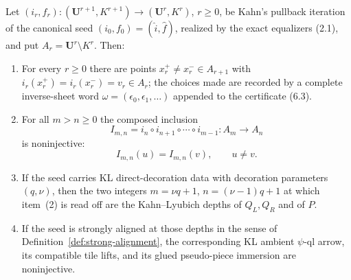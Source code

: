 \begin{theorem}\label{thm:propagation}
Let \((i_r,f_r)\colon(\mathbf U^{r+1},K^{r+1})\to(\mathbf U^r,K^r)\), \(r\ge0\), be Kahn's pullback iteration of the canonical seed \((i_0,f_0)=(\widehat i,\widehat f)\), realized by the exact equalizers (2.1), and put \(A_r=\mathbf U^r\setminus K^r\).  Then:
\begin{enumerate}
\item For every \(r\ge0\) there are points \(x_r^+\ne x_r^-\in A_{r+1}\) with \(i_r(x_r^+)=i_r(x_r^-)=v_r\in A_r\); the choices made are recorded by a complete inverse-sheet word \(\omega=(\epsilon_0,\epsilon_1,\dots)\) appended to the certificate (6.3).
\item For all \(m>n\ge0\) the composed inclusion
\[
 I_{m,n}=i_n\circ i_{n+1}\circ\cdots\circ i_{m-1}\colon A_m\to A_n   \tag{7.4}
\]
is noninjective:
\[
 I_{m,n}(u)=I_{m,n}(v),\qquad u\ne v.                 \tag{7.5}
\]
\item If the seed carries KL direct-decoration data with decoration parameters \((q,\nu)\), then the two integers \(m=\nu q+1\), \(n=(\nu-1)q+1\) at which item~(2) is read off are the Kahn--Lyubich depths of \(Q_L,Q_R\) and of \(P\).
\item If the seed is strongly aligned at those depths in the sense of Definition~\ref{def:strong-alignment}, the corresponding KL ambient \(\psi\)-ql arrow, its compatible tile lifts, and its glued pseudo-piece immersion are noninjective.
\end{enumerate}
\end{theorem}

